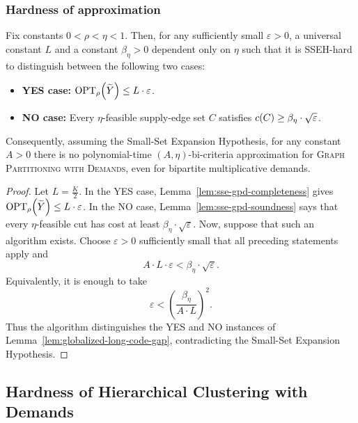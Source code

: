 \subsubsection{Hardness of approximation}
\begin{theorem}\label{thm:sse-gpd-bicriteria-hardness}
    Fix constants $0<\rho<\eta<1$. Then, for any sufficiently small $\varepsilon>0$, a universal constant $L$ and a constant $\beta_\eta>0$ dependent only on $\eta$ such that it is SSEH-hard to distinguish between the following two cases:
    \begin{itemize}
        \item \textbf{YES case:} $\textup{OPT}_{\rho}\mathopen{}\left( \widetilde Y \right)\leq L\cdot\varepsilon$.
        \item \textbf{NO case:} Every $\eta$-feasible supply-edge set $C$ satisfies $c\mathopen{}\left( C \right)\geq\beta_\eta\cdot\sqrt{\varepsilon}$.
    \end{itemize}
    Consequently, assuming the Small-Set Expansion Hypothesis, for any constant $A>0$ there is no polynomial-time $(A,\eta)$-bi-criteria approximation for \textsc{Graph Partitioning with Demands}, even for bipartite multiplicative demands.
\end{theorem}
\begin{proof}
    Let $L=\frac{K}{2}$. 
    In the YES case, Lemma~\ref{lem:sse-gpd-completeness} gives $\textup{OPT}_{\rho}\mathopen{}\left( \widetilde Y \right)\leq L\cdot\varepsilon$.
    In the NO case, Lemma~\ref{lem:sse-gpd-soundness} says that every $\eta$-feasible cut has cost at least $\beta_\eta\cdot\sqrt{\varepsilon}$. 
    Now, suppose that such an algorithm exists. Choose $\varepsilon>0$ sufficiently small that all preceding statements apply and
    \[
        A\cdot L\cdot\varepsilon<\beta_\eta\cdot\sqrt{\varepsilon}.
    \]
    Equivalently, it is enough to take
    \[
        \varepsilon<\left(\frac{\beta_\eta}{A\cdot L}\right)^2.
    \]
    Thus the algorithm distinguishes the YES and NO instances of Lemma~\ref{lem:globalized-long-code-gap}, contradicting the Small-Set Expansion Hypothesis.
\end{proof}
\fi

\subsection{Hardness of Hierarchical Clustering with Demands}


